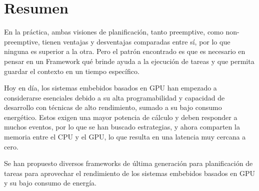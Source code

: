 \section{Resumen}
En la práctica, ambas visiones de planificación, tanto preemptive, como non-preemptive, tienen ventajas y desventajas comparadas entre sí, por lo que ninguna es superior a la otra. Pero el patrón encontrado es que es necesario en pensar en un Framework qué brinde ayuda a la ejecución de tareas y que permita guardar el contexto en un tiempo específico. 

Hoy en día, los sistemas embebidos basados en GPU han empezado a considerarse esenciales debido a su alta programabilidad y capacidad de desarrollo con técnicas de alto rendimiento, sumado a su bajo consumo energético. Estos exigen una mayor potencia de cálculo y deben responder a muchos eventos, por lo que se han buscado estrategias, y ahora comparten la memoria entre el CPU y el GPU, lo que resulta en una latencia muy cercana a cero.

Se han propuesto diversos frameworks de última generación para planificación de tareas para aprovechar el rendimiento de los sistemas embebidos basados en GPU y su bajo consumo de energía.





